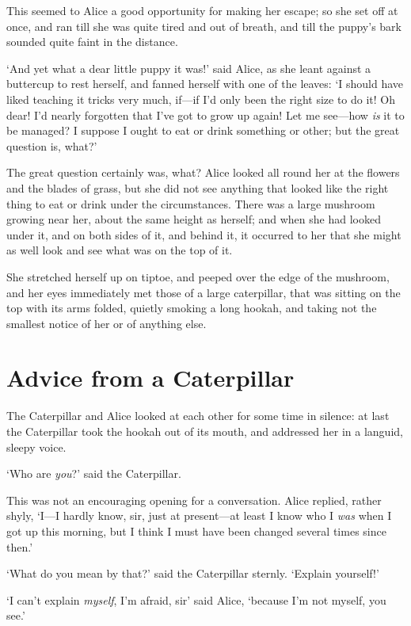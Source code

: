 \documentclass[12pt,openany]{memoir}
\begin{document}
This seemed to Alice a good opportunity for making her escape; so she set off at once, and ran till she was quite tired and out of breath, and till the puppy's bark sounded quite faint in the distance.

`And yet what a dear little puppy it was!' said Alice, as she leant against a buttercup to rest herself, and fanned herself with one of the leaves: `I should have liked teaching it tricks very much, if---if I'd only been the right size to do it! Oh dear! I'd nearly forgotten that I've got to grow up again! Let me see---how \textit{is} it to be managed? I suppose I ought to eat or drink something or other; but the great question is, what?'

The great question certainly was, what? Alice looked all round her at the flowers and the blades of grass, but she did not see anything that looked like the right thing to eat or drink under the circumstances. There was a large mushroom growing near her, about the same height as herself; and when she had looked under it, and on both sides of it, and behind it, it occurred to her that she might as well look and see what was on the top of it.

She stretched herself up on tiptoe, and peeped over the edge of the mushroom, and her eyes immediately met those of a large caterpillar, that was sitting on the top with its arms folded, quietly smoking a long hookah, and taking not the smallest notice of her or of anything else.


\chapter{Advice from a Caterpillar}

The Caterpillar and Alice looked at each other for some time in silence: at last the Caterpillar took the hookah out of its mouth, and addressed her in a languid, sleepy voice.

`Who are \textit{you}?' said the Caterpillar.

This was not an encouraging opening for a conversation. Alice replied, rather shyly, `I---I hardly know, sir, just at present---at least I know who I \textit{was} when I got up this morning, but I think I must have been changed several times since then.'

`What do you mean by that?' said the Caterpillar sternly. `Explain yourself!'

`I can't explain \textit{myself}, I'm afraid, sir' said Alice, `because I'm not myself, you see.'
\end{document}
